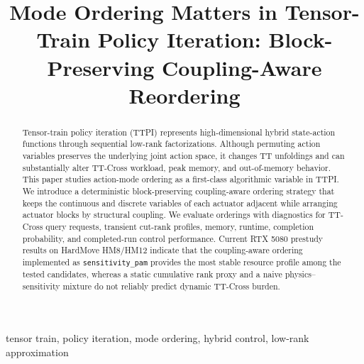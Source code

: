 \documentclass[conference]{IEEEtran}
\title{Mode Ordering Matters in Tensor-Train Policy Iteration: Block-Preserving Coupling-Aware Reordering}
\author{\IEEEauthorblockN{Anonymous Authors}
\IEEEauthorblockA{\textit{Anonymous Institution}\\
Anonymous City, Anonymous Country\\
anonymous@example.com}}
\begin{document}
\maketitle

\begin{abstract}
Tensor-train policy iteration (TTPI) represents high-dimensional hybrid
state-action functions through sequential low-rank factorizations. Although
permuting action variables preserves the underlying joint action space, it
changes TT unfoldings and can substantially alter TT-Cross workload, peak
memory, and out-of-memory behavior. This paper studies action-mode ordering as a
first-class algorithmic variable in TTPI. We introduce a deterministic
block-preserving coupling-aware ordering strategy that keeps the continuous and
discrete variables of each actuator adjacent while arranging actuator blocks by
structural coupling. We evaluate orderings with diagnostics for TT-Cross query
requests, transient cut-rank profiles, memory, runtime, completion probability,
and completed-run control performance. Current RTX 5080 prestudy results on
HardMove HM8/HM12 indicate that the coupling-aware ordering implemented as
\texttt{sensitivity\_pam} provides the most stable resource profile among the
tested candidates, whereas a static cumulative rank proxy and a naive
physics--sensitivity mixture do not reliably predict dynamic TT-Cross burden.
\end{abstract}

\begin{IEEEkeywords}
tensor train, policy iteration, mode ordering, hybrid control, low-rank approximation
\end{IEEEkeywords}











\end{document}
